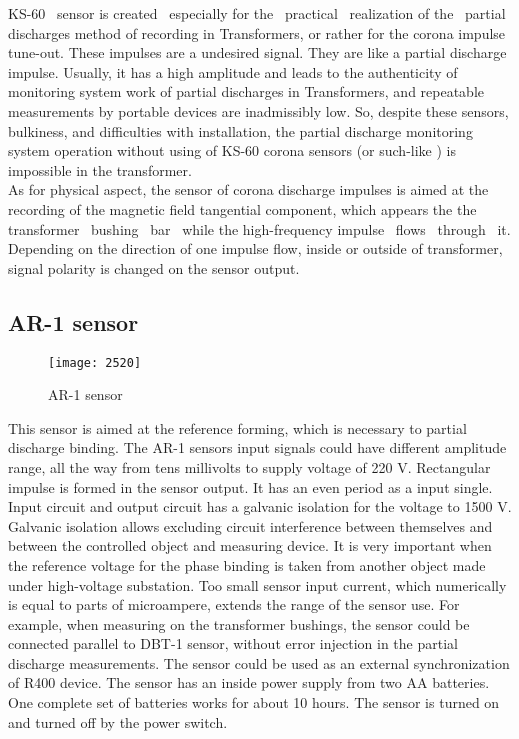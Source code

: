 KS-60 ~sensor is created ~especially for the ~practical ~realization of the ~partial discharges method of recording in Transformers, or rather for the corona impulse tune-out. These impulses are a undesired signal. They are like a partial discharge impulse. Usually, it has a high amplitude and leads to the authenticity of monitoring system work of partial discharges in Transformers, and repeatable measurements by portable devices are inadmissibly low. So, despite these sensors, bulkiness, and difficulties with installation, the partial discharge monitoring system operation without using of KS-60 corona sensors (or such-like ) is impossible in the transformer.\\
 
As for physical aspect, the sensor of corona discharge impulses is aimed at the recording of the magnetic field tangential component, which appears the the transformer ~bushing ~bar ~while the high-frequency impulse ~flows ~through ~it. Depending on the direction of one impulse flow, inside or outside of transformer, signal polarity is changed on the sensor output.

\subsection{AR-1 sensor}
\begin{figure}[h!]
\centering
\texttt{[image: 2520]}
\caption{AR-1 sensor}
\label{fig:AR-1 sensor}
\end{figure}

This sensor is aimed at the reference forming, which is necessary to partial discharge binding. The AR-1 sensors input signals could have different amplitude range, all the way from tens millivolts to supply voltage of 220 V. Rectangular impulse is formed in the sensor output. It has an even period as a input single. Input circuit and output circuit has a galvanic isolation for the voltage to 1500 V. Galvanic isolation allows excluding circuit interference between themselves and between the controlled object and measuring device. It is very important when the reference voltage for the phase binding is taken from another object made under high-voltage substation. Too small sensor input current, which numerically is equal to parts of microampere, extends the range of the sensor use. For example, when measuring on the transformer bushings, the sensor could be connected parallel to DBT-1 sensor, without error injection in the partial discharge measurements. The sensor could be used as an external synchronization of R400 device. The sensor has an inside power supply from two AA batteries. One complete set of batteries works for about 10 hours. The sensor is turned on and turned off by the power switch.

